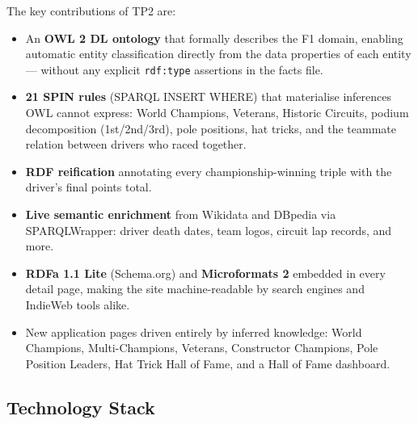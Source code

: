 \documentclass[12pt,a4paper]{article}
\begin{document}
The key contributions of TP2 are:

\begin{itemize}[leftmargin=1.5em]
  \item An \textbf{OWL 2 DL ontology} that formally describes the F1 domain,
        enabling automatic entity classification directly from the data properties
        of each entity --- without any explicit \texttt{rdf:type} assertions in
        the facts file.
  \item \textbf{21 SPIN rules} (SPARQL INSERT WHERE) that materialise
        inferences OWL cannot express: World Champions, Veterans, Historic
        Circuits, podium decomposition (1st/2nd/3rd), pole positions,
        hat tricks, and the teammate relation between drivers who raced together.
  \item \textbf{RDF reification} annotating every championship-winning triple
        with the driver's final points total.
  \item \textbf{Live semantic enrichment} from Wikidata and DBpedia via
        SPARQLWrapper: driver death dates, team logos, circuit lap records, and more.
  \item \textbf{RDFa 1.1 Lite} (Schema.org) and \textbf{Microformats 2} embedded
        in every detail page, making the site machine-readable by search engines
        and IndieWeb tools alike.
  \item New application pages driven entirely by inferred knowledge:
        World Champions, Multi-Champions, Veterans, Constructor Champions,
        Pole Position Leaders, Hat Trick Hall of Fame, and a Hall of Fame dashboard.
\end{itemize}

\subsection{Technology Stack}
\end{document}
